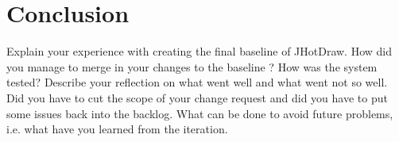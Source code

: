 \section{Conclusion}
Explain your experience with creating the final baseline of JHotDraw.
How did you manage to merge in your changes to the baseline ?
How was the system tested?
Describe your reflection on what went well and what went not so well. 
Did you have to cut the scope of your change request and did you have to put some issues back into the backlog. 
What can be done to avoid future problems, i.e. what have you learned from the iteration.
